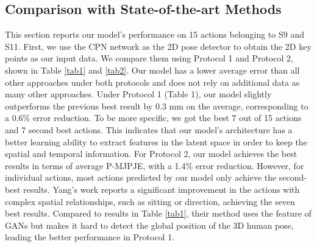 \documentclass[runningheads]{llncs}
\begin{document}
\subsection{Comparison with State-of-the-art Methods}


This section reports our model's performance on 15 actions belonging to S9 and S11. First, we use the CPN network as the 2D pose detector to obtain the 2D key points as our input data. We compare them using Protocol 1 and Protocol 2, shown in Table \ref{tab1} and \ref{tab2}. Our model has a lower average error than all other approaches under both protocols and does not rely on additional data as many other approaches. Under Protocol 1 (Table 1), our model slightly outperforms the previous best result \cite{Xu_2020_CVPR} by 0.3 mm on the average, corresponding to a 0.6\% error reduction. To be more specific, we got the best 7 out of 15 actions and 7 second best actions. This indicates that our model's architecture has a better learning ability to extract features in the latent space in order to keep the spatial and temporal information.
For Protocol 2, our model achieves the best results in terms of average P-MJPJE, with a 1.4\% error reduction. However, for individual actions, most actions predicted by our model only achieve the second-best results. Yang's \cite{Yang_2018_CVPR} work reports a significant improvement in the actions with complex spatial relationships, such as sitting or direction, achieving the seven best results. Compared to results in Table \ref{tab1}, their method uses the feature of GANs but makes it hard to detect the global position of the 3D human pose, leading the better performance in Protocol 1.
\end{document}
